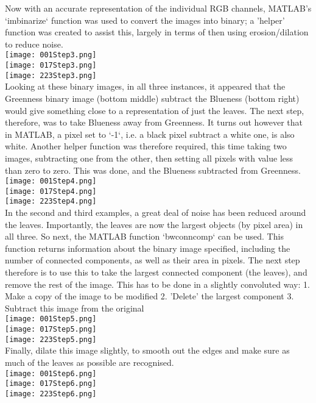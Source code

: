 \documentclass[12pt]{article}
\begin{document}
Now with an accurate representation of the individual RGB channels, MATLAB's `imbinarize` function was used
to convert the images into binary; a 'helper' function was created to assist this, largely in terms of
then using erosion/dilation to reduce noise.\\
\texttt{[image: 001Step3.png]}\\
\texttt{[image: 017Step3.png]}\\
\texttt{[image: 223Step3.png]}\\

Looking at these binary images, in all three instances, it appeared that the Greenness binary image (bottom
middle) subtract the Blueness (bottom right) would give something close to a representation of just the leaves. The next step,
therefore, was to take Blueness away from Greenness. It turns out however that in MATLAB, a pixel
set to `-1`, i.e. a black pixel subtract a white one, is also white. Another helper function was therefore
required, this time taking two images, subtracting one from the other, then setting all pixels with
value less than zero to zero. This was done, and the Blueness subtracted from Greenness.\\
\texttt{[image: 001Step4.png]}\\
\texttt{[image: 017Step4.png]}\\
\texttt{[image: 223Step4.png]}\\

In the second and third examples, a great deal of noise has been reduced around the leaves. Importantly,
the leaves are now the largest objects (by pixel area) in all three. So next, the MATLAB function
`bwconncomp` can be used. This function returns information about the binary image specified, including the number of
connected components, as well as their area in pixels. The next step therefore is to use this to take the
largest connected component (the leaves), and remove the rest of the image. This has to be done in a slightly
convoluted way:
  1. Make a copy of the image to be modified
  2. 'Delete' the largest component
  3. Subtract this image from the original\\
\texttt{[image: 001Step5.png]}\\
\texttt{[image: 017Step5.png]}\\
\texttt{[image: 223Step5.png]}\\

Finally, dilate this image slightly, to smooth out the edges and make sure as much of the leaves as
possible are recognised.\\
\texttt{[image: 001Step6.png]}\\
\texttt{[image: 017Step6.png]}\\
\texttt{[image: 223Step6.png]}\\
\end{document}
